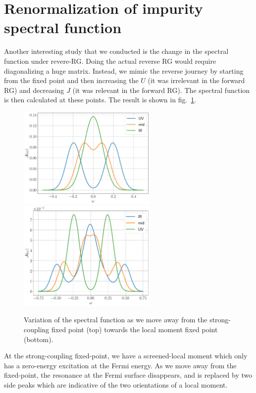 \documentclass[12pt,twoside]{report}
\numberwithin{equation}{section}
\begin{document}
\section{Renormalization of impurity spectral function}
Another interesting study that we conducted is the change in the spectral function under revere-RG. Doing the actual reverse RG would require diagonalizing a huge matrix. Instead, we mimic the reverse journey by starting from the fixed point and then increasing the \(U\) (it was irrelevant in the forward RG) and decreasing \(J\) (it was relevant in the forward RG). The spectral function is then calculated at these points. The result is shown in fig.~\ref{spec_rev}.
\begin{figure}[htpb]
	\centering
	\includegraphics[width=0.6\textwidth]{../figures/spec_func_journey_one.pdf}
	\includegraphics[width=0.6\textwidth]{../figures/spec_func_journey_three.pdf}
	\caption{Variation of the spectral function as we move away from the strong-coupling fixed point (top) towards the local moment fixed point (bottom).}
	\label{spec_rev}
\end{figure}
At the strong-coupling fixed-point, we have a screened-local moment which only has a zero-energy excitation at the Fermi energy. As we move away from the fixed-point, the resonance at the Fermi surface disappears, and is replaced by two side peaks which are indicative of the two orientations of a local moment.
\end{document}
